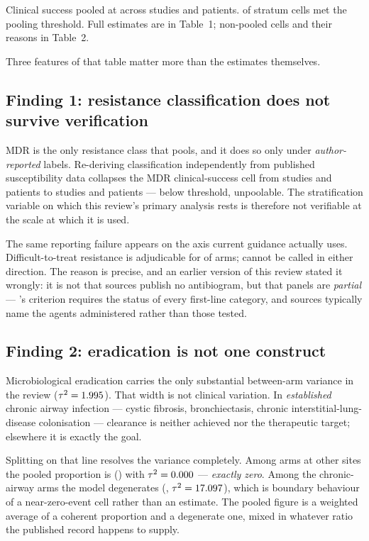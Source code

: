 \documentclass[12pt]{article}
\begin{document}
Clinical success pooled at \CsOverallEstCI across \CsOverallK studies and \CsOverallN patients. \CellsPooled of \CellsTotal stratum cells met the pooling threshold. Full estimates are in Table~1; non-pooled cells and their reasons in Table~2.

Three features of that table matter more than the estimates themselves.

\subsection*{Finding 1: resistance classification does not survive verification}

MDR is the only resistance class that pools, and it does so only under \emph{author-reported} labels. Re-deriving classification independently from published susceptibility data collapses the MDR clinical-success cell from \ClassMDRStudiesAll studies and \ClassMDRPatientsAll patients to \ClassMDRStudiesVerified studies and \ClassMDRPatientsVerified patients --- below threshold, unpoolable. The stratification variable on which this review's primary analysis rests is therefore not verifiable at the scale at which it is used.

The same reporting failure appears on the axis current guidance actually uses. Difficult-to-treat resistance is adjudicable for \DtrAdjudicable of \ArmsAnalysed arms; \DtrNotDerivableArms cannot be called in either direction. The reason is precise, and an earlier version of this review stated it wrongly: it is not that sources publish no antibiogram, but that panels are \emph{partial} --- \citeauthor{Kadri2018_dtr}'s criterion requires the status of every first-line category, and sources typically name the agents administered rather than those tested.

\subsection*{Finding 2: eradication is not one construct}

Microbiological eradication carries the only substantial between-arm variance in the review ($\tau^2=1.995$). That width is not clinical variation. In \emph{established} chronic airway infection --- cystic fibrosis, bronchiectasis, chronic interstitial-lung-disease colonisation --- clearance is neither achieved nor the therapeutic target; elsewhere it is exactly the goal.

Splitting on that line resolves the variance completely. Among \EradOtherArms arms at other sites the pooled proportion is \EradOtherEst(\EradOtherCI) with $\tau^2=0.000$ --- \emph{exactly zero}. Among the \EradAirArms chronic-airway arms the model degenerates (\EradAirEst, $\tau^2=17.097$), which is boundary behaviour of a near-zero-event cell rather than an estimate. The pooled figure is a weighted average of a coherent proportion and a degenerate one, mixed in whatever ratio the published record happens to supply.
\end{document}
